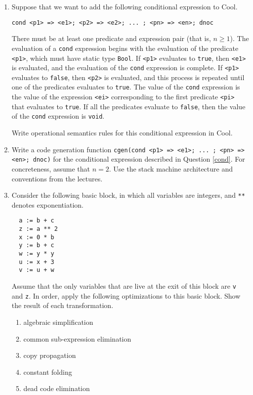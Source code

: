 \documentclass[11pt]{article}
\begin{document}
\begin{enumerate}

\item
\label{cond}
Suppose that we want to add the following conditional expression to
Cool.
\vspace{-0.5\baselineskip}
\begin{verbatim}
cond <p1> => <e1>; <p2> => <e2>; ... ; <pn> => <en>; dnoc
\end{verbatim}

\vspace{-0.5\baselineskip}
There must be at least one predicate and expression pair (that is,
$n \geq 1$).  The evaluation of a \texttt{cond} expression begins with
the evaluation of the predicate \texttt{<p1>}, which must have static
type \texttt{Bool}.  If \texttt{<p1>} evaluates to \texttt{true}, then
\texttt{<e1>} is evaluated, and the evaluation of the \texttt{cond}
expression is complete.  If \texttt{<p1>} evaluates to \texttt{false},
then \texttt{<p2>} is evaluated, and this process is repeated until
one of the predicates evaluates to \texttt{true}.  The value of the
\texttt{cond} expression is the value of the expression \texttt{<ei>}
corresponding to the first predicate \texttt{<pi>} that evaluates to
\texttt{true}.  If all the predicates evaluate to \texttt{false}, then
the value of the \texttt{cond} expression is \texttt{void}.

Write operational semantics rules for this conditional expression in
Cool.

\item
Write a code generation function
\texttt{cgen(cond <p1> => <e1>; ... ; <pn> => <en>; dnoc)} for the
conditional expression described in Question \ref{cond}.  For
concreteness, assume that $n = 2$.  Use the stack machine architecture
and conventions from the lectures.

\item
Consider the following basic block, in which all variables are
integers, and \texttt{**} denotes exponentiation.
\begin{verbatim}
  a := b + c
  z := a ** 2
  x := 0 * b
  y := b + c
  w := y * y
  u := x + 3
  v := u + w
\end{verbatim}
Assume that the only variables that are live at the exit of this block
are \texttt{v} and \texttt{z}.  In order, apply the following
optimizations to this basic block.  Show the result of each
transformation.
\begin{enumerate}
\item algebraic simplification
\item common sub-expression elimination
\item copy propagation
\item constant folding
\item dead code elimination
\end{enumerate}


\end{enumerate}
\end{document}
